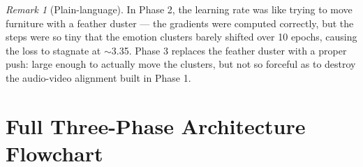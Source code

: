 \documentclass[12pt,a4paper]{article}
\theoremstyle{definition}
\theoremstyle{remark}
\newtheorem{remark}[theorem]{Remark}
\begin{document}
\begin{remark}[Plain-language]
In Phase 2, the learning rate was like trying to move furniture
with a feather duster — the gradients were computed correctly,
but the steps were so tiny that the emotion clusters barely shifted
over 10 epochs, causing the loss to stagnate at $\sim$3.35.
Phase 3 replaces the feather duster with a proper push: large enough
to actually move the clusters, but not so forceful as to destroy the
audio-video alignment built in Phase 1.
\end{remark}

\section{Full Three-Phase Architecture Flowchart}
\end{document}
